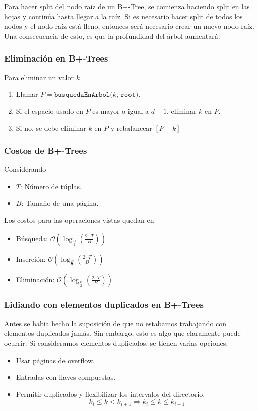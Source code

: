 Para hacer split del nodo raíz de un B+-Tree, se comienza haciendo split en las hojas y continúa hasta llegar a la raíz. Si es necesario hacer split de todos los nodos y el nodo raíz está lleno, entonces será necesario crear un nuevo nodo raíz. Una consecuencia de esto, es que la profundidad del árbol aumentará.

\subsubsection{Eliminación en B+-Trees}
Para eliminar un valor $k$
\begin{enumerate}
  \item Llamar $P = \texttt{busquedaEnArbol($k$, root)}$.
  \item Si el espacio usado en $P$ es mayor o igual a $d+1$, eliminar $k$ en $P$.
  \item Si no, se debe eliminar $k$ en $P$ y rebalancear $[P + k]$
\end{enumerate}

\subsubsection{Costos de B+-Trees}
Considerando
\begin{itemize}
  \item $T$: Número de túplas.
  \item $B$: Tamaño de una página.
\end{itemize}

Los costos para las operaciones vistas quedan en
\begin{itemize}
  \item Búsqueda: $\mathcal{O}(\log_{\frac{B}{2}}(\frac{2 \cdot T}{B}))$
  \item Inserción: $\mathcal{O}(\log_{\frac{B}{2}}(\frac{2 \cdot T}{B}))$
  \item Eliminación: $\mathcal{O}(\log_{\frac{B}{2}}(\frac{2 \cdot T}{B}))$
\end{itemize}

\subsubsection{Lidiando con elementos duplicados en B+-Trees}
Antes se habia hecho la suposición de que no estabamos trabajando con elementos duplicados jamás. Sin embargo, esto es algo que claramente puede ocurrir. Si consideramos elementos duplicados, se tienen varias opciones.
\begin{itemize}
  \item Usar páginas de overflow.
  \item Entradas con llaves compuestas.
  \item Permitir duplicados y flexibilizar los intervalos del directorio.
  \[ k_i \leq k < k_{i+1} \Rightarrow k_i \leq k \leq k_{i+1} \]
\end{itemize}

